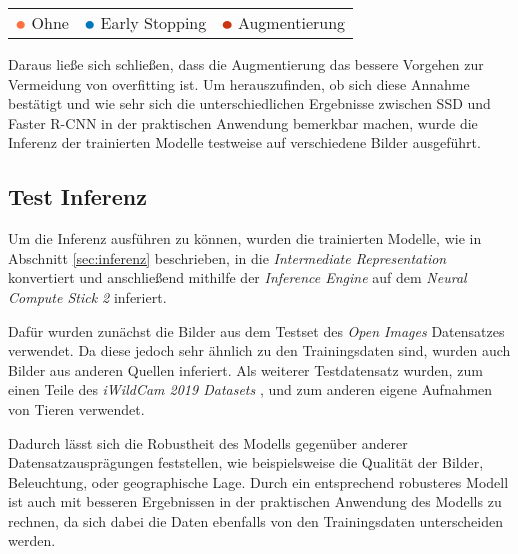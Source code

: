\begin{table}[htb]
  \centering
  \begin{tabular}{m{}<{\centering}
                  m{}<{\centering}
                  m{}<{\centering}}
      $\color[HTML]{FF7043}\medbullet$  Ohne 
    & $\color[HTML]{0077BB}\medbullet$  Early Stopping 
    & $\color[HTML]{CC3311}\medbullet$  Augmentierung
  \end{tabular}    
\end{table}


Daraus ließe sich schließen, dass die Augmentierung das 
bessere Vorgehen zur Vermeidung von \Gls{overfitting} ist.
Um herauszufinden, ob sich diese Annahme bestätigt 
und wie sehr sich die unterschiedlichen Ergebnisse
zwischen SSD und Faster R-CNN in der praktischen Anwendung
bemerkbar machen, wurde die Inferenz der
trainierten Modelle testweise auf verschiedene Bilder
ausgeführt.


\subsection{Test Inferenz}\label{sec:test_inferenz}

Um die Inferenz ausführen zu 
können, wurden die trainierten Modelle, wie in Abschnitt
\ref{sec:inferenz} beschrieben, 
in die \textit{Intermediate Representation} konvertiert 
und anschließend mithilfe der \textit{Inference Engine} auf 
dem \textit{Neural Compute Stick 2} inferiert.

Dafür wurden zunächst die Bilder aus dem Testset des
\textit{Open Images} Datensatzes verwendet. Da diese jedoch 
sehr ähnlich zu den Trainingsdaten sind, wurden 
auch Bilder aus anderen Quellen inferiert.
Als weiterer Testdatensatz wurden, zum einen Teile des
\textit{iWildCam 2019 Datasets}
\cite{beeryIWildCam2019Challenge2019},
und zum anderen eigene Aufnahmen von Tieren 
verwendet.

Dadurch lässt sich die Robustheit des Modells 
gegenüber anderer Datensatzausprägungen feststellen,
wie beispielsweise die Qualität der Bilder, Beleuchtung, 
oder geographische Lage.
Durch ein entsprechend robusteres Modell ist auch 
mit besseren Ergebnissen in der praktischen Anwendung 
des Modells zu rechnen, da sich dabei die Daten 
ebenfalls von den Trainingsdaten unterscheiden werden.




